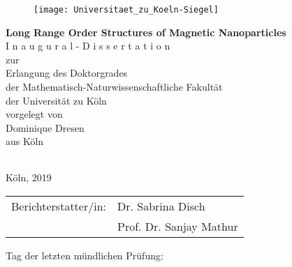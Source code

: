 \begin{titlepage}

\topmargin 5mm

\begin{center}
\begin{figure}[H]
  \centering
    \texttt{[image: Universitaet\_zu\_Koeln-Siegel]}
    \end{figure}

   \LARGE\textbf{Long Range Order Structures of Magnetic Nanoparticles} \\[30mm]
   \Large{I n a u g u r a l - D i s s e r t a t i o n } \\
	 \Large{zur}\\
	 \Large{Erlangung des Doktorgrades}\\
	\Large{der Mathematisch-Naturwissenschaftliche Fakultät}\\
	\Large der Universität zu Köln\\[20mm]
   \Large{vorgelegt von}\\
   \Large{Dominique Dresen}\\
	 \Large{aus Köln}\\[30mm]



\begin{table}[h]
\begin{tabularx}{\textwidth}{X}\hline\end{tabularx}
\end{table}

\normalsize{Köln, 2019}\\
\end{center}
\end{titlepage}

\newpage
{}

\vspace{100mm}
\begin{tabular}[t]{ll}

Berichterstatter/in: & Dr. Sabrina Disch\\
										& Prof. Dr. Sanjay Mathur\\ [25mm]
\end{tabular}

Tag der letzten mündlichen Prüfung:



